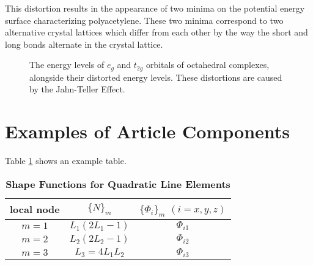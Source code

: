 \documentclass[9pt,twocolumn,twoside]{optica}
\begin{document}
 This distortion results in the appearance of two minima on the potential energy surface characterizing polyacetylene. These two minima correspond to two alternative crystal lattices  which differ from each other by the way the short and long bonds alternate in the crystal lattice.







\begin{figure}[htbp]
\centering
{}
\caption{The energy levels of $e_g$ and $t_{2g}$ orbitals of octahedral complexes, alongside their distorted energy levels. These distortions are caused by the Jahn-Teller Effect.}
\label{fig:Jahn}
\end{figure}
































\section{Examples of Article Components}


\label{sec:examples}



Table \ref{tab:shape-functions} shows an example table. 

\begin{table}[htbp]
\centering
\caption{\bf Shape Functions for Quadratic Line Elements}
\begin{tabular}{ccc}
\hline
local node & $\{N\}_m$ & $\{\Phi_i\}_m$ $(i=x,y,z)$ \\
\hline
$m = 1$ & $L_1(2L_1-1)$ & $\Phi_{i1}$ \\
$m = 2$ & $L_2(2L_2-1)$ & $\Phi_{i2}$ \\
$m = 3$ & $L_3=4L_1L_2$ & $\Phi_{i3}$ \\
\hline
\end{tabular}
  \label{tab:shape-functions}
\end{table}
\end{document}
